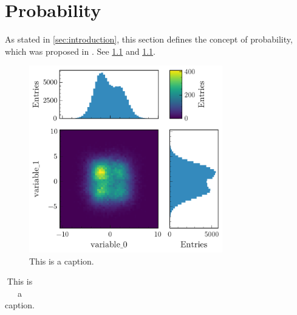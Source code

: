 \chapter{Probability} \label{sec:probability}
As stated in \cref{sec:introduction}, this section defines the concept of probability, which was proposed in \cite{kolmogorov}.
See \cref{fig:probability} and \cref{tab:probability}.

\begin{figure}[tb]
\centering
\includegraphics[width=0.75\textwidth]{figs/2d_hist_with_projections.pdf}
\caption{This is a caption.}
\label{fig:probability}
\end{figure}

\begin{table}[bt]
\caption{This is a caption.}
\begin{center}
\begin{tabular}{lll}

\end{tabular}
\end{center}
\label{tab:probability}
\end{table}
